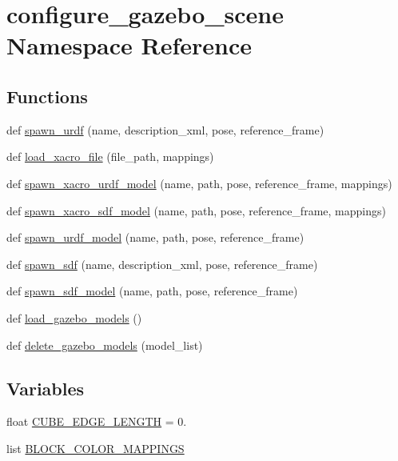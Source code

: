 \hypertarget{namespaceconfigure__gazebo__scene}{}\section{configure\+\_\+gazebo\+\_\+scene Namespace Reference}
\label{namespaceconfigure__gazebo__scene}
\subsection*{Functions}
\begin{DoxyCompactItemize}
\item 
def \hyperlink{namespaceconfigure__gazebo__scene_a7889d32e94d3772a954ef4e6159d97e1}{spawn\+\_\+urdf} (name, description\+\_\+xml, pose, reference\+\_\+frame)
\item 
def \hyperlink{namespaceconfigure__gazebo__scene_a9e2008c04a5ca68232c2e385d776d9f8}{load\+\_\+xacro\+\_\+file} (file\+\_\+path, mappings)
\item 
def \hyperlink{namespaceconfigure__gazebo__scene_ab316a0c48017b0f2f926f3bdcb3563bf}{spawn\+\_\+xacro\+\_\+urdf\+\_\+model} (name, path, pose, reference\+\_\+frame, mappings)
\item 
def \hyperlink{namespaceconfigure__gazebo__scene_a93f5cc1a7688db255f542e857e93815e}{spawn\+\_\+xacro\+\_\+sdf\+\_\+model} (name, path, pose, reference\+\_\+frame, mappings)
\item 
def \hyperlink{namespaceconfigure__gazebo__scene_a75fe4471366cb6d150afa431b7130013}{spawn\+\_\+urdf\+\_\+model} (name, path, pose, reference\+\_\+frame)
\item 
def \hyperlink{namespaceconfigure__gazebo__scene_ab3490d3439ce332f734e218c5ff53a28}{spawn\+\_\+sdf} (name, description\+\_\+xml, pose, reference\+\_\+frame)
\item 
def \hyperlink{namespaceconfigure__gazebo__scene_a075d9fd087101805bf2b41e46c1bda25}{spawn\+\_\+sdf\+\_\+model} (name, path, pose, reference\+\_\+frame)
\item 
def \hyperlink{namespaceconfigure__gazebo__scene_a1de44bc5d9559c667441cfb56a72f519}{load\+\_\+gazebo\+\_\+models} ()
\item 
def \hyperlink{namespaceconfigure__gazebo__scene_aeeae97678050eb8dbd60b01c72a4d3da}{delete\+\_\+gazebo\+\_\+models} (model\+\_\+list)
\end{DoxyCompactItemize}
\subsection*{Variables}
\begin{DoxyCompactItemize}
\item 
float \hyperlink{namespaceconfigure__gazebo__scene_afb3c90e32ac162e99a711bd0a8fe03ac}{C\+U\+B\+E\+\_\+\+E\+D\+G\+E\+\_\+\+L\+E\+N\+G\+TH} = 0.
\item 
list \hyperlink{namespaceconfigure__gazebo__scene_af8cc2d588a02690aa6e82b403bb9a645}{B\+L\+O\+C\+K\+\_\+\+C\+O\+L\+O\+R\+\_\+\+M\+A\+P\+P\+I\+N\+GS}
\end{DoxyCompactItemize}


